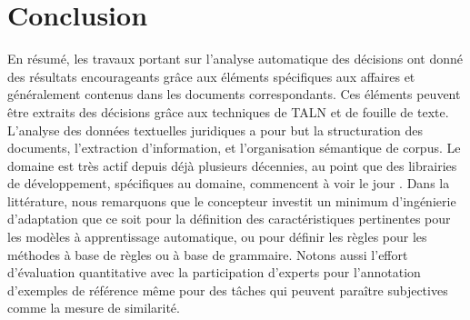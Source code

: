 \section{Conclusion}
\label{sec:literature:conclusion}
En résumé, les travaux portant sur l'analyse automatique des décisions ont donné des résultats encourageants grâce aux éléments spécifiques aux affaires et généralement contenus dans les documents correspondants. Ces éléments peuvent être extraits des décisions grâce aux techniques de TALN et de fouille de texte.  L'analyse des données textuelles juridiques a pour but la structuration des documents, l'extraction d'information, et l'organisation sémantique de corpus. Le domaine est très actif depuis déjà plusieurs décennies, au point que des librairies de développement, spécifiques au domaine, commencent à voir le jour \citep{bommarito2018lexnlp}. Dans la littérature, nous remarquons que le concepteur investit un minimum d'ingénierie d'adaptation que ce soit pour la définition des caractéristiques pertinentes pour les modèles à apprentissage automatique, ou pour définir les règles pour les méthodes à base de règles ou à base de grammaire. Notons aussi l'effort d'évaluation quantitative avec la participation d'experts pour l'annotation d'exemples de référence même pour des tâches qui peuvent paraître subjectives comme la mesure de similarité.



